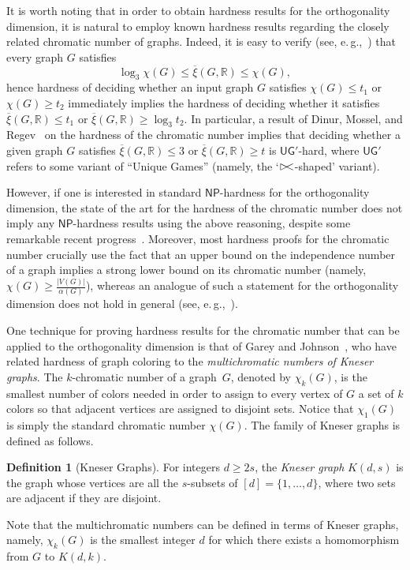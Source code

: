 \documentclass[11pt]{article}
\numberwithin{equation}{section}
\theoremstyle{definition}
\newtheorem{definition}[theorem]{Definition}
\theoremstyle{plain}
\newcommand{\R}{\mathbb R}
\newcommand{\NP}{\mathsf{NP}}
\newcommand{\UG}{\mathsf{UG}}   %
\newcommand{\od}{\overline{\xi}}
\newcommand\fish{{\rhd \hskip -0.5 em <}}
\begin{document}
It is worth noting that in order to obtain hardness results for the orthogonality dimension,
%
%
it is natural to employ known hardness results regarding the closely related chromatic number of graphs. Indeed, it is easy to verify (see, e.\,g.,~\cite{HavivMFCS19}) that every graph $G$ satisfies
\[\log_3 \chi(G) \leq \od(G,\R) \leq \chi(G),\]
hence hardness of deciding whether an input graph $G$ satisfies $\chi(G) \leq t_1$ or $\chi(G) \geq t_2$ immediately implies the hardness of deciding whether it satisfies $\od(G,\R) \leq t_1$ or $\od(G,\R) \geq \log_3 t_2$. In particular, a result of Dinur, Mossel, and Regev~\cite{DinurMR06} on the hardness of the chromatic number implies that %
%
%
%
deciding whether a given graph $G$ satisfies $\od(G,\R) \leq 3$ or $\od(G,\R) \geq t$
%
%
%
%
%
is $\UG'$-hard, where $\UG'$ refers to some variant of
``Unique Games'' (namely, the `$\fish$-shaped' variant). %

However, if one is interested in standard $\NP$-hardness for the orthogonality dimension, the state of the art for the hardness of the chromatic number does not imply
%
%
%
any $\NP$-hardness  %
results using the above reasoning, despite some remarkable recent progress~\cite{BartoBKO21,WZ20}.
Moreover, most hardness proofs for the chromatic number crucially use the fact that an upper bound on the independence number of a graph implies a strong lower bound on its chromatic number (namely, $\chi(G) \geq \frac{|V(G)|}{\alpha(G)}$), whereas an analogue of such a statement for the orthogonality dimension does not hold in general (see, e.\,g.,~\cite[Proposition~2.2]{HavivMFCS19}).

One technique for proving hardness results for the chromatic number that can be applied %
to  %
the orthogonality dimension is that of Garey and Johnson~\cite{GareyJ76a}, who have related hardness of graph coloring to the \emph{multichromatic numbers of Kneser graphs}. The
%
$k$-chromatic
number of a graph~$G$, denoted by $\chi_k(G)$, is the smallest number of colors needed in order to assign to every vertex of $G$ a set of $k$ colors so that adjacent vertices are assigned to disjoint sets. Notice that $\chi_1(G)$ is simply the standard chromatic number $\chi(G)$. The family of Kneser graphs is defined as follows.
\begin{definition}[Kneser Graphs]\label{def:Kneser}
For integers $d \geq 2s$, the \emph{Kneser graph} $K(d,s)$ is the graph whose vertices are all the $s$-subsets of $[d]=\{1,\ldots,d\}$, where two sets are adjacent if they are disjoint.
\end{definition}
\noindent
Note that the multichromatic numbers can be defined in terms of Kneser graphs, namely, $\chi_k(G)$ is the smallest integer $d$ for which there exists a homomorphism from $G$ to $K(d,k)$.
\end{document}
